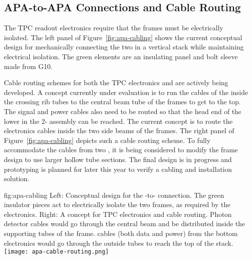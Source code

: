 \subsection{APA-to-APA Connections and Cable Routing}
\label{sec:fdsp-apa-intfc-apa}

The TPC readout electronics require that the  frames must be electrically isolated.  The left panel of Figure~\ref{fig:apa-cabling} shows the current conceptual design for mechanically connecting the two  in a vertical stack while maintaining electrical isolation.  The green elements are an insulating panel and bolt sleeve made from G10. 

Cable routing schemes for both the TPC electronics and  are actively being developed.  A concept currently under evaluation is to run the cables of the  inside the crossing rib tubes to the central beam tube of the  frames to get to the top.  The  signal and power cables also need to be routed so that the head end of the lower  in the 2- assembly can be reached. The current concept is to route the electronics cables inside the two side beams of the  frames. The right panel of Figure~\ref{fig:apa-cabling} depicts such a cable routing scheme. To fully accommodate the cables from two , it is being considered to modify the  frame design to use larger hollow tube sections. The final design is in progress and prototyping is planned for later this year to verify a cabling and installation solution.     

\begin{dunefigure}{fig:apa-cabling}
{Left: Conceptual design for the -to- connection.  The green insulator pieces act to electrically isolate the two frames, as required by the  electronics.  Right: A concept for TPC electronics and  cable routing. Photon detector cables would go through the central beam and be distributed inside the supporting tubes of the  frame.   cables (both data and power) from the bottom  electronics would go through the outside tubes to reach the top of the stack.}
\setlength{\fboxsep}{0pt}
\setlength{\fboxrule}{0.5pt}
\qquad \quad
\texttt{[image: apa-cable-routing.png]}
\end{dunefigure}
